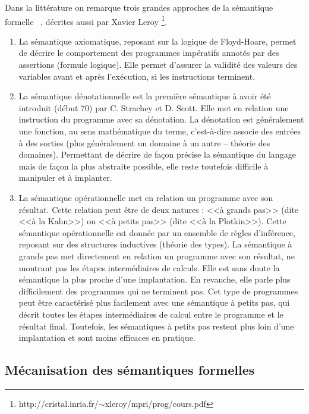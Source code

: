       Dans la littérature on remarque trois grandes approches de la sémantique formelle \cite{Winskel:1993:FSP:151145}~, décrites aussi par Xavier Leroy \footnote{http://cristal.inria.fr/$\sim$xleroy/mpri/prog/cours.pdf}.
      
      \begin{enumerate}
      
        \item La sémantique axiomatique, reposant sur la logique de Floyd-Hoare, permet de décrire le comportement des programmes impératifs annotés par des assertions (formule logique). Elle permet d'assurer la validité des valeurs des variables avant et après l'exécution, si les instructions terminent. 
        
        \item La sémantique dénotationnelle est la première sémantique à avoir été introduit (début 70) par C. Strachey et D. Scott. Elle met en relation une instruction du programme avec sa dénotation. La dénotation est généralement une fonction, au sens mathématique du terme, c'est-à-dire associe des entrées à des sorties (plus généralement un domaine à un autre -- théorie des domaines). Permettant de décrire de façon précise la sémantique du langage mais de façon la plus abstraite possible, elle reste toutefois difficile à manipuler et à implanter. 
        
        \item La sémantique opérationnelle met en relation un programme avec son résultat. Cette relation peut être de deux natures : <<à grands pas>> (dite <<à la Kahn>>) ou <<à petits pas>> (dite <<à la Plotkin>>). Cette sémantique opérationnelle est donnée par un ensemble de règles d'inférence, reposant sur des structures inductives (théorie des types). 
        La sémantique à grands pas met directement en relation un programme avec son résultat, ne montrant pas les étapes intermédiaires de calculs. Elle est sans doute la sémantique la plus proche d'une implantation. En revanche, elle parle plus difficilement des programmes qui ne terminent pas. Cet type de programmes peut être caractérisé plus facilement avec une sémantique à petits pas, qui décrit toutes les étapes intermédiaires de calcul entre le programme et le résultat final. Toutefois, les sémantiques à petits pas restent plus loin d'une implantation et sont moins efficaces en pratique.
      
      \end{enumerate} 
         
    \subsection{Mécanisation des sémantiques formelles}
      

